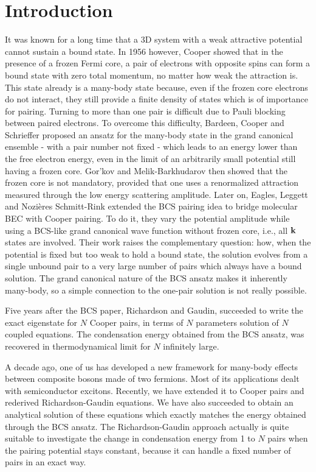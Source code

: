 \documentclass[5p,twocolumn]{elsarticle}
\begin{document}
\section{Introduction}
It was known for a long time that a 3D system with a weak attractive potential cannot sustain a bound state.  In 1956 however, Cooper showed that in the presence of a frozen Fermi core, a pair of electrons with opposite spins can form a bound state with zero total momentum,  no matter how weak the attraction is\cite{Cooper}.  This state already is a many-body state because, even if the frozen core electrons do not interact, they still provide a finite density of states which is of importance for pairing. Turning to more than one pair is difficult due to Pauli blocking between paired electrons. To overcome this difficulty, Bardeen, Cooper and Schrieffer proposed an ansatz for the many-body state in the grand canonical ensemble - with a pair number not fixed - which leads to an energy lower than the free electron energy, even in the limit of an arbitrarily small potential still having a frozen core\cite{BCS}. Gor'kov and Melik-Barkhudarov then showed that the frozen core is not
  mandatory, provided that one uses a renormalized attraction measured through the low energy scattering amplitude\cite{Gorkov}.   Later on, Eagles\cite{Eagle}, Leggett\cite{LeggettCrossover} and Nozi\`{e}res Schmitt-Rink\cite{Nozieres} extended the BCS pairing idea to bridge molecular BEC with Cooper pairing. To do it, they vary the potential amplitude while using a BCS-like grand canonical wave function without frozen core, i.e., all $\mathbf{k}$ states are involved.  Their work raises the complementary question: how, when the potential is fixed but too weak to hold a bound state, the solution evolves from a single unbound pair to a very large number of pairs which always have  a bound solution. The grand canonical nature of the BCS ansatz makes it inherently many-body, so a simple connection to the one-pair solution is not really possible.  

Five years after the BCS paper, Richardson\cite{Richardson1} and Gaudin\cite{gaudin}, succeeded to write the exact eigenstate for $N$ Cooper pairs, in terms of $N$ parameters solution of $N$ coupled equations. The condensation energy obtained from the BCS ansatz, was recovered in thermodynamical limit for $N$ infinitely large\cite{Richardson2,Richardson3,Richardson1968}. 

A decade ago, one of us has developed a new framework\cite{CobosonPhysicsReports} for many-body effects between composite bosons made of two fermions. Most of its applications dealt with semiconductor excitons.   Recently, we have extended it to Cooper pairs and rederived Richardson-Gaudin equations\cite{CobosonBcsRich}. We have also succeeded to obtain an analytical solution of these equations \cite{moth,CombescotCooper,combescotBCS} which exactly matches the energy obtained through the BCS ansatz.  The Richardson-Gaudin approach actually is quite suitable to investigate the change in condensation energy from 1 to $N$ pairs when the pairing potential stays constant, because it can handle a fixed number of pairs in an exact way.
\end{document}
